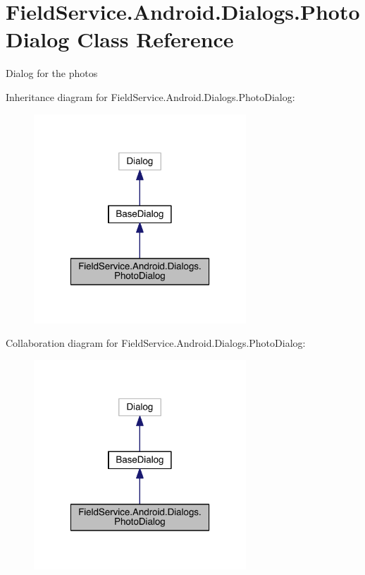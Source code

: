 \hypertarget{class_field_service_1_1_android_1_1_dialogs_1_1_photo_dialog}{\section{Field\+Service.\+Android.\+Dialogs.\+Photo\+Dialog Class Reference}
\label{class_field_service_1_1_android_1_1_dialogs_1_1_photo_dialog}
}


Dialog for the photos  




Inheritance diagram for Field\+Service.\+Android.\+Dialogs.\+Photo\+Dialog\+:
\nopagebreak
\begin{figure}[H]
\begin{center}
\leavevmode
\includegraphics[width=226pt]{class_field_service_1_1_android_1_1_dialogs_1_1_photo_dialog__inherit__graph}
\end{center}
\end{figure}


Collaboration diagram for Field\+Service.\+Android.\+Dialogs.\+Photo\+Dialog\+:
\nopagebreak
\begin{figure}[H]
\begin{center}
\leavevmode
\includegraphics[width=226pt]{class_field_service_1_1_android_1_1_dialogs_1_1_photo_dialog__coll__graph}
\end{center}
\end{figure}
